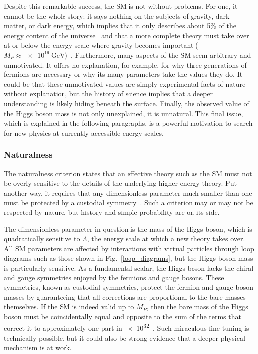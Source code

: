 

Despite this remarkable success, the SM is not without problems. For one, it cannot be the whole story: it says nothing on the subjects of gravity, dark matter, or dark energy, which implies that it only describes about 5\% of the energy content of the universe~\cite{fukugita_2004} and that a more complete theory must take over at or below the energy scale where gravity becomes important ($M_{P}\approx\SI{e19}{\GeV}$)~\cite{giudice_naturalness_2008}. Furthermore, many aspects of the SM seem arbitrary and unmotivated. It offers no explanation, for example, for why three generations of fermions are necessary or why its many parameters take the values they do. It could be that these unmotivated values are simply experimental facts of nature without explanation, but the history of science implies that a deeper understanding is likely hiding beneath the surface. Finally, the observed value of the Higgs boson mass is not only unexplained, it is unnatural. This final issue, which is explained in the following paragraphs, is a powerful motivation to search for new physics at currently accessible energy scales.

\subsubsection{Naturalness}
The naturalness criterion states that an effective theory such as the SM must not be overly sensitive to the details of the underlying higher energy theory. Put another way, it requires that any dimensionless parameter much smaller than one must be protected by a custodial symmetry~\cite{thooft_naturalness}. Such a criterion may or may not be respected by nature, but history and simple probability are on its side.

The dimensionless parameter in question is the mass of the Higgs boson, which is quadratically sensitive to $\Lambda$, the energy scale at which a new theory takes over. All SM parameters are affected by interactions with virtual particles through loop diagrams such as those shown in Fig.~\ref{loop_diagrams}, but the Higgs boson mass is particularly sensitive. As a fundamental scalar, the Higgs boson lacks the chiral and gauge symmetries enjoyed by the fermions and gauge bosons. These symmetries, known as custodial symmetries, protect the fermion and gauge boson masses by guaranteeing that all corrections are proportional to the bare masses themselves. If the SM is indeed valid up to $M_{P}$, then the bare mass of the Higgs boson must be coincidentally equal and opposite to the sum of the terms that correct it to approximately one part in \num{e32}~\cite{giudice_naturalness_2008}. Such miraculous fine tuning is technically possible, but it could also be strong evidence that a deeper physical mechanism is at work.




\pagebreak